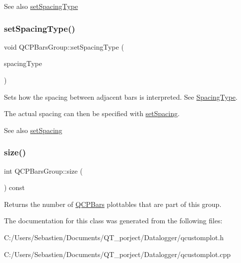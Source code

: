 \begin{DoxySeeAlso}{See also}
\hyperlink{class_q_c_p_bars_group_a2c7e2d61b10594a4555b615e1fcaf49e}{set\+Spacing\+Type} 
\end{DoxySeeAlso}
\mbox{\label{class_q_c_p_bars_group_a2c7e2d61b10594a4555b615e1fcaf49e}} 
\subsubsection{\texorpdfstring{set\+Spacing\+Type()}{setSpacingType()}}
{\footnotesize\ttfamily void Q\+C\+P\+Bars\+Group\+::set\+Spacing\+Type (\begin{DoxyParamCaption}\item[{\hyperlink{class_q_c_p_bars_group_a4c0521120a97e60bbca37677a37075b6}{Spacing\+Type}}]{spacing\+Type }\end{DoxyParamCaption})}

Sets how the spacing between adjacent bars is interpreted. See \hyperlink{class_q_c_p_bars_group_a4c0521120a97e60bbca37677a37075b6}{Spacing\+Type}.

The actual spacing can then be specified with \hyperlink{class_q_c_p_bars_group_aa553d327479d72a0c3dafcc724a190e2}{set\+Spacing}.

\begin{DoxySeeAlso}{See also}
\hyperlink{class_q_c_p_bars_group_aa553d327479d72a0c3dafcc724a190e2}{set\+Spacing} 
\end{DoxySeeAlso}
\mbox{\label{class_q_c_p_bars_group_a3780ec77919cb00840207ec7a0f00dd5}} 
\subsubsection{\texorpdfstring{size()}{size()}}
{\footnotesize\ttfamily int Q\+C\+P\+Bars\+Group\+::size (\begin{DoxyParamCaption}{ }\end{DoxyParamCaption}) const\hspace{0.3cm}{\ttfamily [inline]}}

Returns the number of \hyperlink{class_q_c_p_bars}{Q\+C\+P\+Bars} plottables that are part of this group. 

The documentation for this class was generated from the following files\+:\begin{DoxyCompactItemize}
\item 
C\+:/\+Users/\+Sebastien/\+Documents/\+Q\+T\+\_\+porject/\+Datalogger/qcustomplot.\+h\item 
C\+:/\+Users/\+Sebastien/\+Documents/\+Q\+T\+\_\+porject/\+Datalogger/qcustomplot.\+cpp\end{DoxyCompactItemize}
